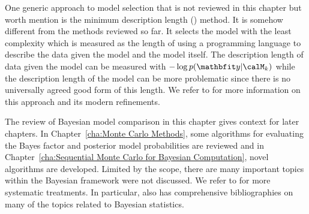 One generic approach to model selection that is not reviewed in this chapter
but worth mention is the minimum description length (\mdl) method. It is
somehow different from the methods reviewed so far. It selects the model with
the least complexity which is measured as the length of using a programming
language to describe the data given the model and the model itself. The
description length of data given the model can be measured with $-\log
p(\data|\calM_k)$ while the description length of the model can be more
problematic since there is no universally agreed good form of this length. We
refer to \cite{Grunwald:2005vx} for more information on this approach and its
modern refinements.

The review of Bayesian model comparison in this chapter gives context for
later chapters. In Chapter~\ref{cha:Monte Carlo Methods}, some algorithms for
evaluating the Bayes factor and posterior model probabilities are reviewed
and in Chapter~\ref{cha:Sequential Monte Carlo for Bayesian Computation},
novel algorithms are developed. Limited by the scope, there are many
important topics within the Bayesian framework were not discussed. We refer
to \cite{Bernardo:1994vd,Robert:2007tc} for more systematic treatments. In
particular, \cite{Bernardo:1994vd} also has comprehensive bibliographies on
many of the topics related to Bayesian statistics.
